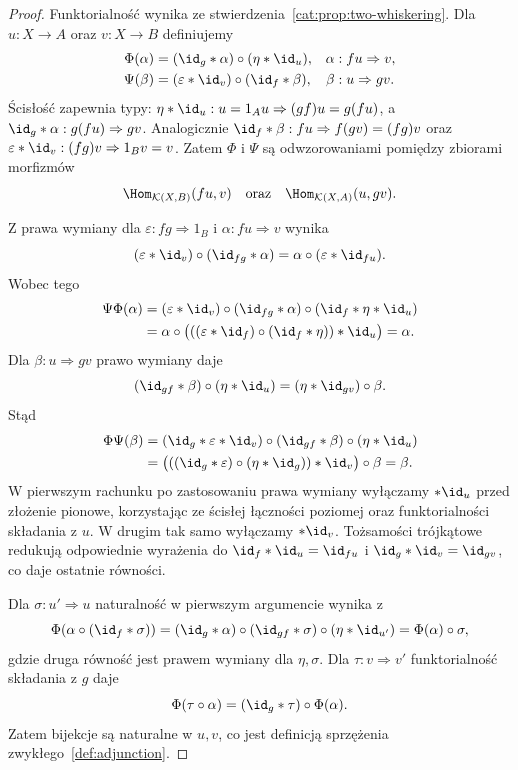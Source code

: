\begin{proof}
Funktorialność wynika ze stwierdzenia~\ref{cat:prop:two-whiskering}. Dla $u:X\to A$ oraz $v:X\to B$ definiujemy
\[
\begin{aligned}
 \Phi(\alpha)&=(\id_g\ast\alpha)\circ(\eta\ast\id_u),
 &\alpha&:fu\Rightarrow v,\\
 \Psi(\beta)&=(\varepsilon\ast\id_v)\circ(\id_f\ast\beta),
 &\beta&:u\Rightarrow gv.
\end{aligned}
\]
Ścisłość zapewnia typy: $\eta\ast\id_u:u=1_Au\Rightarrow(gf)u=g(fu)$, a $\id_g\ast\alpha:g(fu)\Rightarrow gv$. Analogicznie $\id_f\ast\beta:fu\Rightarrow f(gv)=(fg)v$ oraz $\varepsilon\ast\id_v:(fg)v\Rightarrow1_Bv=v$. Zatem $\Phi$ i $\Psi$ są odwzorowaniami pomiędzy zbiorami morfizmów
\[
 \Hom_{\mathcal K(X,B)}(fu,v)
 \quad\text{oraz}\quad
 \Hom_{\mathcal K(X,A)}(u,gv).
\]

Z prawa wymiany dla $\varepsilon:fg\Rightarrow1_B$ i $\alpha:fu\Rightarrow v$ wynika
\[
 (\varepsilon\ast\id_v)\circ(\id_{fg}\ast\alpha)
 =\alpha\circ(\varepsilon\ast\id_{fu}).
\]
Wobec tego
\[
\begin{aligned}
 \Psi\Phi(\alpha)
 &=(\varepsilon\ast\id_v)\circ(\id_{fg}\ast\alpha)
        \circ(\id_f\ast\eta\ast\id_u)\\
 &=\alpha\circ
   \bigl(((\varepsilon\ast\id_f)\circ(\id_f\ast\eta))\ast\id_u\bigr)
 =\alpha.
\end{aligned}
\]
Dla $\beta:u\Rightarrow gv$ prawo wymiany daje
\[
 (\id_{gf}\ast\beta)\circ(\eta\ast\id_u)
 =(\eta\ast\id_{gv})\circ\beta.
\]
Stąd
\[
\begin{aligned}
 \Phi\Psi(\beta)
 &=(\id_g\ast\varepsilon\ast\id_v)
        \circ(\id_{gf}\ast\beta)\circ(\eta\ast\id_u)\\
 &=\bigl(((\id_g\ast\varepsilon)\circ(\eta\ast\id_g))
         \ast\id_v\bigr)\circ\beta=\beta.
\end{aligned}
\]
W pierwszym rachunku po zastosowaniu prawa wymiany wyłączamy $\ast\id_u$ przed złożenie pionowe, korzystając ze ścisłej łączności poziomej oraz funktorialności składania z $u$. W drugim tak samo wyłączamy $\ast\id_v$. Tożsamości trójkątowe redukują odpowiednie wyrażenia do $\id_f\ast\id_u=\id_{fu}$ i $\id_g\ast\id_v=\id_{gv}$, co daje ostatnie równości.

Dla $\sigma:u'\Rightarrow u$ naturalność w pierwszym argumencie wynika z
\[
 \Phi(\alpha\circ(\id_f\ast\sigma))
 =(\id_g\ast\alpha)\circ(\id_{gf}\ast\sigma)
    \circ(\eta\ast\id_{u'})
 =\Phi(\alpha)\circ\sigma,
\]
gdzie druga równość jest prawem wymiany dla $\eta,\sigma$. Dla $\tau:v\Rightarrow v'$ funktorialność składania z $g$ daje
\[
 \Phi(\tau\circ\alpha)=(\id_g\ast\tau)\circ\Phi(\alpha).
\]
Zatem bijekcje są naturalne w $u,v$, co jest definicją sprzężenia zwykłego~\ref{def:adjunction}.
\end{proof}

